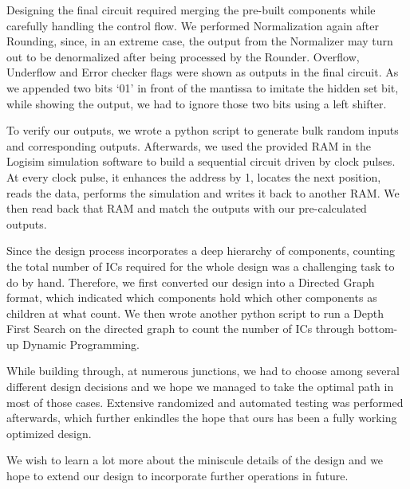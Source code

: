 \documentclass[12pt]{article}
\begin{document}
\vspace{3mm}

Designing the final circuit required merging the pre-built components while carefully handling the control flow. We performed Normalization again after Rounding, since, in an extreme case, the output from the Normalizer may turn out to be denormalized after being processed by the Rounder. Overflow, Underflow and Error checker flags were shown as outputs in the final circuit. As we appended two bits ‘01’ in front of the mantissa to imitate the hidden set bit, while showing the output, we had to ignore those two bits using a left shifter. 

\vspace{3mm}

To verify our outputs, we wrote a python script to generate bulk random inputs and corresponding outputs. Afterwards, we used the provided RAM in the Logisim simulation software to build a sequential circuit driven by clock pulses. At every clock pulse, it enhances the address by 1, locates the next position, reads the data, performs the simulation and writes it back to another RAM. We then read back that RAM and match the outputs with our pre-calculated outputs. 

\vspace{3mm}

Since the design process incorporates a deep hierarchy of components, counting the total number of ICs required for the whole design was a challenging task to do by hand. Therefore, we first converted our design into a Directed Graph format, which indicated which components hold which other components as children at what count. We then wrote another python script to run a Depth First Search on the directed graph to count the number of ICs through bottom-up Dynamic Programming. 

\newpage

\vspace{3mm}

While building through, at numerous junctions, we had to choose among several different design decisions and we hope we managed to take the optimal path in most of those cases. Extensive randomized and automated testing was performed afterwards, which further enkindles the hope that ours has been a fully working optimized design. 

\vspace{3mm}

We wish to learn a lot more about the miniscule details of the design and we hope to extend our design to incorporate further operations in future.
\end{document}
